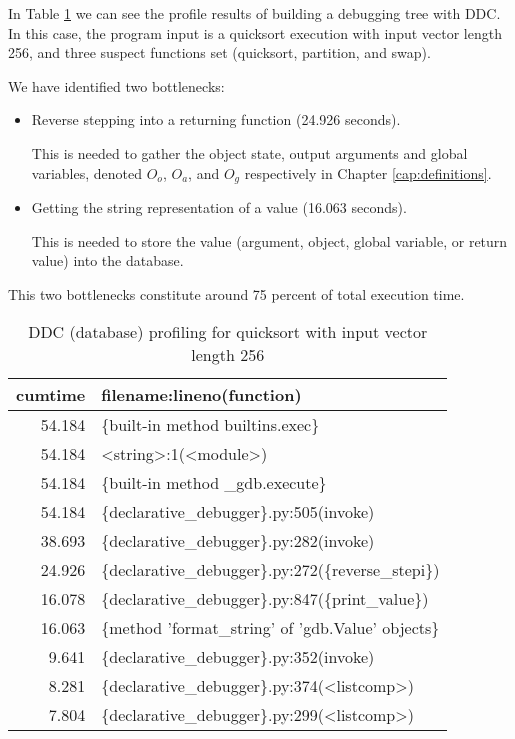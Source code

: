 In Table \ref{table:DDC_profile} we can see the profile results of building a debugging tree with DDC. In this case, the program input is a quicksort execution with input vector length 256, and three suspect functions set (quicksort, partition, and swap). 
 
We have identified two bottlenecks:
\begin{itemize}
    \item Reverse stepping into a returning function (24.926 seconds).
    
    This is needed to gather the object state, output arguments and global variables, denoted \(O_o\), \(O_a\), and \(O_g\) respectively in Chapter \ref{cap:definitions}.
    
    \item Getting the string representation of a value (16.063 seconds).
    
    This is needed to store the value (argument, object, global variable, or return value) into the database.
\end{itemize}
This two bottlenecks constitute around 75 percent of total execution time.
 
\begin{table}
\caption{DDC (database) profiling for quicksort with input vector length 256}
\label{table:DDC_profile}
\begin{tabular}{rl}
cumtime & filename:lineno(function)\\
\hline
54.184 & \{built-in method builtins.exec\}\\
54.184 & <string>:1(<module>)\\
54.184 & \{built-in method \_gdb.execute\}\\
54.184 & \{declarative\_debugger\}.py:505(invoke)\\
38.693 & \{declarative\_debugger\}.py:282(invoke)\\
24.926 & \{declarative\_debugger\}.py:272(\{reverse\_stepi\})\\
16.078 & \{declarative\_debugger\}.py:847(\{print\_value\})\\
16.063 & \{method 'format\_string'  of 'gdb.Value'  objects\}\\
9.641 & \{declarative\_debugger\}.py:352(invoke)\\
8.281 & \{declarative\_debugger\}.py:374(<listcomp>)\\
7.804 & \{declarative\_debugger\}.py:299(<listcomp>)\\
\end{tabular}
\end{table}

